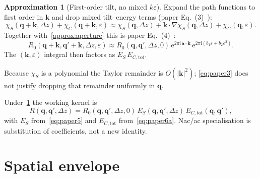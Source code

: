 \documentclass[11pt,a4paper]{article}
\theoremstyle{definition}
\newtheorem{approximation}[theorem]{Approximation}
\theoremstyle{remark}
\newcommand{\ee}{\mathrm{e}}
\newcommand{\ii}{\mathrm{i}}
\newcommand{\abs}[1]{\lvert#1\rvert}
\newcommand{\Dz}{\Delta z}
\newcommand{\EStot}{E_{S}}
\newcommand{\ECtot}{E_{C,\mathrm{tot}}}
\newcommand{\Rzero}{R_{0}}
\begin{document}
\begin{approximation}[First-order tilt, no mixed $k\varepsilon$]
\label{approx:taylor}
Expand the path functions to first order in $\mathbf{k}$ and drop mixed
tilt--energy terms (paper Eq.~(3)~\cite{Yu2019}):
\begin{equation}
\label{eq:paper3}
\chi_S(\mathbf{q}+\mathbf{k},\Dz)+\chi_C(\mathbf{q}+\mathbf{k},\varepsilon)
\approx
\chi_S(\mathbf{q},\Dz)
+\mathbf{k}\cdot\nabla\chi_S(\mathbf{q},\Dz)
+\chi_C(\mathbf{q},\varepsilon).
\end{equation}
Together with~\cref{approx:aperture} this is paper Eq.~(4)~\cite{Yu2019}:
\begin{equation}
\label{eq:R0approx}
\Rzero(\mathbf{q}+\mathbf{k},\mathbf{q}'+\mathbf{k},\Dz,\varepsilon)
\approx
\Rzero(\mathbf{q},\mathbf{q}',\Dz,0)
\,\ee^{2\pi\ii\,\mathbf{a}\cdot\mathbf{k}}
\,\ee^{2\pi\ii(b_1\varepsilon+b_2\varepsilon^2)}.
\end{equation}
The $(\mathbf{k},\varepsilon)$ integral then factors as
$\EStot\,\ECtot$.
\end{approximation}
Because $\chi_S$ is a polynomial the Taylor remainder is
$O(\abs{\mathbf{k}}^2)$; \eqref{eq:paper3} does not justify dropping
that remainder uniformly in $\mathbf{q}$.

Under~\cref{approx:taylor} the working kernel is
\begin{equation}
\label{eq:assembly}
R(\mathbf{q},\mathbf{q}',\Dz)
=\Rzero(\mathbf{q},\mathbf{q}',\Dz,0)\,
\EStot(\mathbf{q},\mathbf{q}',\Dz)\,
\ECtot(\mathbf{q},\mathbf{q}'),
\end{equation}
with $\EStot$ from~\eqref{eq:paper5} and $\ECtot$ from~\eqref{eq:paper6a}.
Nac/ac specialisation is substitution of coefficients, not a new
identity.

\section{Spatial envelope}
\label{sec:spatial}
\end{document}
